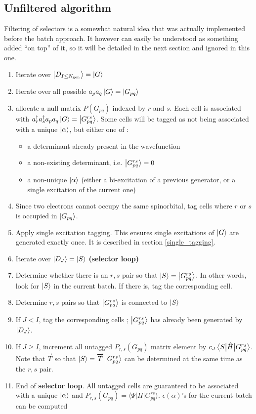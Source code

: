 \documentclass[./thesis.tex]{subfiles}
\begin{document}
\subsection{Unfiltered algorithm}

Filtering of selectors is a somewhat natural idea that was actually implemented before the batch approach. It however can easily be understood as something added ``on top'' of it, so it will be detailed in the next section and ignored in this one.



\begin{enumerate}
\item
Iterate over $\ket {D_{I \leq {N_\text{gen}}}} = \ket G$
\item
Iterate over all possible $a_p a_q \ket G = \ket {G_{pq}}$
\item
allocate a null matrix $P(G_{pq})$ indexed by $r$ and $s$. Each cell is associated with $a^\dagger_r a^\dagger_s a_p a_q  \ket G = \ket {G^{rs}_{pq}}$. Some cells will be tagged as not being associated with a unique $\ket \alpha$, but either one of :
\begin{itemize}
\item
a determinant already present in the wavefunction
\item
a non-existing determinant, i.e. $\ket {G^{rs}_{pq}} = 0$
\item
a non-unique $\ket \alpha$ (either a bi-excitation of a previous generator, or a single excitation of the current one)
\end{itemize}

\item
Since two electrons cannot occupy the same spinorbital, tag cells where $r$ or $s$ is occupied in $\ket {G_{pq}}$.
\item
Apply single excitation tagging. This ensures single excitations of $\ket G$ are generated exactly once. It is described in section \ref{single_tagging}.
\item
Iterate over $\ket {D_J} = \ket S$ \textbf{(selector loop)}
\item
Determine whether there is an $r,s$ pair so that $\ket S = \ket {G_{pq}^{rs}}$. In other words, look for $\ket S$ in the current batch. If there is, tag the corresponding cell.
\item
Determine $r,s$ pairs so that $\ket {G_{pq}^{rs}}$ is connected to $\ket S$
\item
If $J<I$, tag the corresponding cells ; $\ket {G_{pq}^{rs}}$ has already been generated by $\ket {D_J}$.
\item
If $J \geq I$, increment all untagged $P_{r,s}(G_{pq})$ matrix element by $c_J \mel{S}{\hat{H}}{G^{rs}_{pq}}$. Note that $\overrightarrow{T}$ so that $\ket S=\overrightarrow{T} \ket{G^{rs}_{pq}}$ can be determined at the same time as the $r,s$ pair.
\item
End of \textbf{selector loop}. All untagged cells are guaranteed to be associated with a unique $\ket \alpha$ and $P_{r,s}(G_{pq}) = \langle \Psi |H|G^{rs}_{pq} \rangle$. $\epsilon(\alpha)$'s for the current batch can be computed  \\


\end{enumerate}
\end{document}
